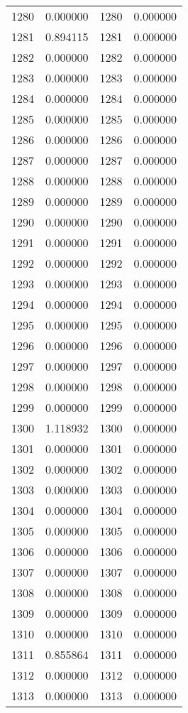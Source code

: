 \documentclass[12pt]{article}
\begin{document}
\begin{longtable}{@{}cccc@{}}
1280 & 0.000000 & 1280 & 0.000000 \\
1281 & 0.894115 & 1281 & 0.000000 \\
1282 & 0.000000 & 1282 & 0.000000 \\
1283 & 0.000000 & 1283 & 0.000000 \\
1284 & 0.000000 & 1284 & 0.000000 \\
1285 & 0.000000 & 1285 & 0.000000 \\
1286 & 0.000000 & 1286 & 0.000000 \\
1287 & 0.000000 & 1287 & 0.000000 \\
1288 & 0.000000 & 1288 & 0.000000 \\
1289 & 0.000000 & 1289 & 0.000000 \\
1290 & 0.000000 & 1290 & 0.000000 \\
1291 & 0.000000 & 1291 & 0.000000 \\
1292 & 0.000000 & 1292 & 0.000000 \\
1293 & 0.000000 & 1293 & 0.000000 \\
1294 & 0.000000 & 1294 & 0.000000 \\
1295 & 0.000000 & 1295 & 0.000000 \\
1296 & 0.000000 & 1296 & 0.000000 \\
1297 & 0.000000 & 1297 & 0.000000 \\
1298 & 0.000000 & 1298 & 0.000000 \\
1299 & 0.000000 & 1299 & 0.000000 \\
1300 & 1.118932 & 1300 & 0.000000 \\
1301 & 0.000000 & 1301 & 0.000000 \\
1302 & 0.000000 & 1302 & 0.000000 \\
1303 & 0.000000 & 1303 & 0.000000 \\
1304 & 0.000000 & 1304 & 0.000000 \\
1305 & 0.000000 & 1305 & 0.000000 \\
1306 & 0.000000 & 1306 & 0.000000 \\
1307 & 0.000000 & 1307 & 0.000000 \\
1308 & 0.000000 & 1308 & 0.000000 \\
1309 & 0.000000 & 1309 & 0.000000 \\
1310 & 0.000000 & 1310 & 0.000000 \\
1311 & 0.855864 & 1311 & 0.000000 \\
1312 & 0.000000 & 1312 & 0.000000 \\
1313 & 0.000000 & 1313 & 0.000000 \\

\end{longtable}
\end{document}
